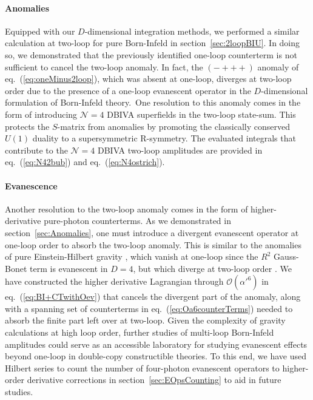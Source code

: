 \documentclass[11pt,letter]{article}
\def\sect#1{section~\ref{#1}}
\def\eqn#1{eq.~(\ref{#1})}
\begin{document}
\paragraph{\textbf{Anomalies}} Equipped with our $D$-dimensional integration methods, we performed a similar calculation at two-loop for pure Born-Infeld in \sect{sec:2loopBIU}. In doing so, we demonstrated that the previously identified one-loop counterterm \cite{Elvang:2020kuj} is not sufficient to cancel the two-loop anomaly. In fact, the $(-+++)$ anomaly of \eqn{eq:oneMinus2loop}, which was absent at one-loop, diverges at two-loop order due to the presence of a one-loop evanescent operator in the $D$-dimensional formulation of Born-Infeld theory.~One resolution to this anomaly comes in the form of introducing $\mathcal{N}=4$ DBIVA superfields in the two-loop state-sum. This protects the $S$-matrix from anomalies by promoting the classically conserved $U(1)$ duality to a supersymmetric R-symmetry. The evaluated integrals that contribute to the $\mathcal{N}=4$ DBIVA two-loop amplitudes are provided in \eqn{eq:N42bub} and \eqn{eq:N4ostrich}. 

\paragraph{\textbf{Evanescence}}Another resolution to the two-loop anomaly comes in the form of higher-derivative pure-photon counterterms. As we demonstrated in \sect{sec:Anomalies}, one must introduce a divergent evanescent operator at one-loop order to absorb the two-loop anomaly. This is similar to the anomalies of pure Einstein-Hilbert gravity \cite{Bern:2015xsa,Bern:2017puu}, which vanish at one-loop since the $R^2$ Gauss-Bonet term is evanescent in $D=4$, but which diverge at two-loop order \cite{Goroff:1985sz,Goroff:1985th,vandeVen:1991gw}. We have constructed the higher derivative Lagrangian through $\mathcal{O}(\alpha'^6)$ in \eqn{eq:BI+CTwithOev} that cancels the divergent part of the anomaly, along with a spanning set of counterterms in \eqn{eq:Oa6counterTerms} needed to absorb the finite part left over at two-loop. Given the complexity of gravity calculations at high loop order, further studies of multi-loop Born-Infeld amplitudes could serve as an accessible laboratory for studying evanescent effects beyond one-loop in double-copy constructible theories. To this end, we have used Hilbert series to count the number of four-photon evanescent operators to higher-order derivative corrections in \sect{sec:EOpsCounting} to aid in future studies. 
\end{document}

